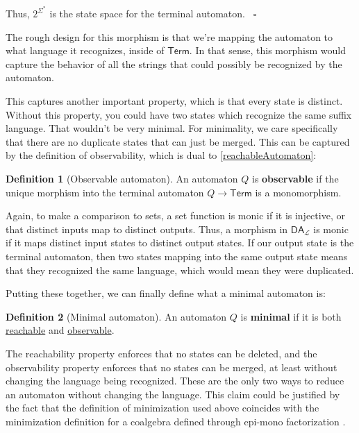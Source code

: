 \documentclass{article}
\theoremstyle{plain}
\theoremstyle{definition}
\newtheorem{definition}{Definition}
\begin{document}
Thus, \ensuremath{{2}^{{\Sigma }^{\ast }}} is the state space for the terminal automaton.  ~\ensuremath{\square}

The rough design for this morphism is that we're mapping the automaton to what language it recognizes, inside of \ensuremath{\mathsf{Term}}. In that sense, this morphism would capture the behavior of all the strings that could possibly be recognized by the automaton.

This captures another important property, which is that every state is distinct. Without this property, you could have two states which recognize the same suffix language. That wouldn't be very minimal. For minimality, we care specifically that there are no duplicate states that can just be merged. This can be captured by the definition of observability, which is dual to \ref{reachableAutomaton}:

\begin{definition}[Observable automaton]
 An automaton \ensuremath{Q} is \textbf{observable} if the unique morphism into the terminal automaton \ensuremath{Q \rightarrow \mathsf{Term}} is a monomorphism. 
\end{definition}
\label{observableAutomaton} 

Again, to make a comparison to sets, a set function is monic if it is injective, or that distinct inputs map to distinct outputs. Thus, a morphism in \ensuremath{{\mathsf{DA}}_{\mathcal{L}}} is monic if it maps distinct input states to distinct output states. If our output state is the terminal automaton, then two states mapping into the same output state means that they recognized the same language, which would mean they were duplicated.

Putting these together, we can finally define what a minimal automaton is:

\begin{definition}[Minimal automaton]
 An automaton \ensuremath{Q} is \textbf{minimal} if it is both \href{}{reachable} and \href{}{observable}. 
\end{definition}
\label{minimalAutomaton} 

The reachability property enforces that no states can be deleted, and the observability property enforces that no states can be merged, at least without changing the language being recognized. These are the only two ways to reduce an automaton without changing the language. This claim could be justified by the fact that the definition of minimization used above coincides with the minimization definition for a coalgebra defined through epi-mono factorization \cite{bezhanishviliMinimizationDuality2012}.
\end{document}
